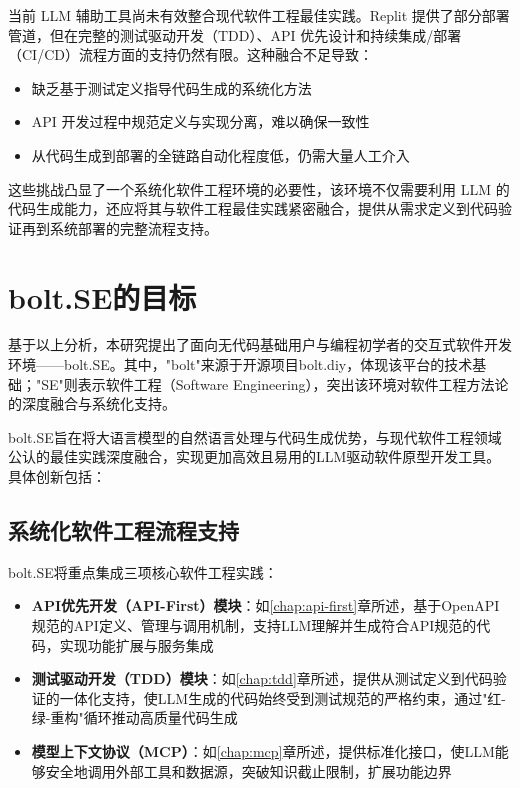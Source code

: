 当前 LLM 辅助工具尚未有效整合现代软件工程最佳实践。Replit 提供了部分部署管道，但在完整的测试驱动开发（TDD）、API 优先设计和持续集成/部署（CI/CD）流程方面的支持仍然有限。这种融合不足导致：

\begin{itemize}
    \item 缺乏基于测试定义指导代码生成的系统化方法
    \item API 开发过程中规范定义与实现分离，难以确保一致性
    \item 从代码生成到部署的全链路自动化程度低，仍需大量人工介入
\end{itemize}

这些挑战凸显了一个系统化软件工程环境的必要性，该环境不仅需要利用 LLM 的代码生成能力，还应将其与软件工程最佳实践紧密融合，提供从需求定义到代码验证再到系统部署的完整流程支持。

\section{bolt.SE的目标}

基于以上分析，本研究提出了面向无代码基础用户与编程初学者的交互式软件开发环境——bolt.SE。其中，"bolt"来源于开源项目bolt.diy，体现该平台的技术基础；"SE"则表示软件工程（Software Engineering），突出该环境对软件工程方法论的深度融合与系统化支持。

bolt.SE旨在将大语言模型的自然语言处理与代码生成优势，与现代软件工程领域公认的最佳实践深度融合，实现更加高效且易用的LLM驱动软件原型开发工具。具体创新包括：

\subsection{系统化软件工程流程支持}

bolt.SE将重点集成三项核心软件工程实践：

\begin{itemize}
    \item \textbf{API优先开发（API-First）模块}：如\ref{chap:api-first}章所述，基于OpenAPI规范的API定义、管理与调用机制，支持LLM理解并生成符合API规范的代码，实现功能扩展与服务集成
    \item \textbf{测试驱动开发（TDD）模块}：如\ref{chap:tdd}章所述，提供从测试定义到代码验证的一体化支持，使LLM生成的代码始终受到测试规范的严格约束，通过"红-绿-重构"循环推动高质量代码生成
    \item \textbf{模型上下文协议（MCP）}：如\ref{chap:mcp}章所述，提供标准化接口，使LLM能够安全地调用外部工具和数据源，突破知识截止限制，扩展功能边界
\end{itemize}

